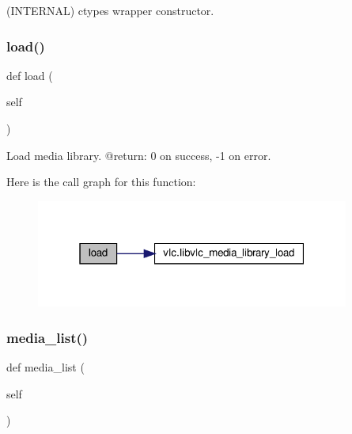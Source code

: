 \begin{DoxyVerb}(INTERNAL) ctypes wrapper constructor.
\end{DoxyVerb}
 \mbox{\label{classvlc_1_1_media_library_aea7c4ced230e9462362c980c5ea47b4d}} 
\subsubsection{\texorpdfstring{load()}{load()}}
{\footnotesize\ttfamily def load (\begin{DoxyParamCaption}\item[{}]{self }\end{DoxyParamCaption})}

\begin{DoxyVerb}Load media library.
@return: 0 on success, -1 on error.
\end{DoxyVerb}
 Here is the call graph for this function\+:
\nopagebreak
\begin{figure}[H]
\begin{center}
\leavevmode
\includegraphics[width=292pt]{classvlc_1_1_media_library_aea7c4ced230e9462362c980c5ea47b4d_cgraph}
\end{center}
\end{figure}
\mbox{\label{classvlc_1_1_media_library_a34194a0d394238d8794d182b65953952}} 
\subsubsection{\texorpdfstring{media\+\_\+list()}{media\_list()}}
{\footnotesize\ttfamily def media\+\_\+list (\begin{DoxyParamCaption}\item[{}]{self }\end{DoxyParamCaption})}

